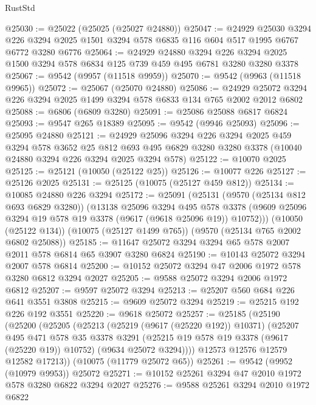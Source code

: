 \begin{lexlean}{RustStd}
\begin{coremodule}
@25030 := @25022 (@25025 (@25027 @24880))
@25047 := @24929
    @25030
    @3294
    @226
    @3294
    @2025
    @1501
    @3294
    @578
    @6835
    @116
    @604
    @517
    @1995
    @6767
    @6772
    @3280
    @6776
@25064 := @24929
    @24880
    @3294
    @226
    @3294
    @2025
    @1500
    @3294
    @578
    @6834
    @125
    @739
    @459
    @495
    @6781
    @3280
    @3280
    @3378
@25067 := @9542 (@9957 (@11518 @9959))
@25070 := @9542 (@9963 (@11518 @9965))
@25072 := @25067 (@25070 @24880)
@25086 := @24929 @25072 @3294 @226 @3294 @2025 @1499 @3294 @578 @6833 @134 @765 @2002 @2012 @6802
@25088 := @6806 (@6809 @3280)
@25091 := @25086 @25088 @6817 @6824
@25093 := @9547 @265 @18389
@25095 := @9542 (@9946 @25093)
@25096 := @25095 @24880
@25121 := @24929
    @25096
    @3294
    @226
    @3294
    @2025
    @459
    @3294
    @578
    @3652
    @25
    @812
    @693
    @495
    @6829
    @3280
    @3280
    @3378
    (@10040 @24880 @3294 @226 @3294 @2025 @3294 @578)
@25122 := @10070 @2025
@25125 := @25121 (@10050 (@25122 @25))
@25126 := @10077 @226
@25127 := @25126 @2025
@25131 := @25125 (@10075 (@25127 @459 @812))
@25134 := @10085 @24880 @226 @3294
@25172 := @25091
    (@25131
      (@9570 (@25134 @812 @693 @6829 @3280))
      (@13138
        @25096
        @3294
        @495
        @578
        @3378
        (@9609 @25096 @3294 @19 @578 @19 @3378 (@9617 (@9618 @25096 @19)) @10752)))
    (@10050 (@25122 @134))
    (@10075 (@25127 @1499 @765))
    (@9570 (@25134 @765 @2002 @6802 @25088))
@25185 := @11647 @25072 @3294 @3294 @65 @578 @2007 @2011 @578 @6814 @65 @3907 @3280 @6824
@25190 := @10143 @25072 @3294 @2007 @578 @6814
@25200 := @10152 @25072 @3294 @47 @2006 @1972 @578 @3280 @6812 @3294 @2027
@25205 := @9588 @25072 @3294 @2006 @1972 @6812
@25207 := @9597 @25072 @3294
@25213 := @25207 @560 @684 @226 @641 @3551 @3808
@25215 := @9609 @25072 @3294
@25219 := @25215 @192 @226 @192 @3551
@25220 := @9618 @25072
@25257 := @25185
    (@25190
      (@25200
        (@25205
          (@25213
            (@25219 (@9617 (@25220 @192)) @10371)
            (@25207
              @495
              @471
              @578
              @35
              @3378
              @3291
              (@25215 @19 @578 @19 @3378 (@9617 (@25220 @19)) @10752)
              (@9634 @25072 @3294))))
        @12573
        @12576
        @12579
        @12582
        @17213))
    (@10075 (@11779 @25072 @65))
@25261 := @9542 (@9952 (@10979 @9953)) @25072
@25271 := @10152 @25261 @3294 @47 @2010 @1972 @578 @3280 @6822 @3294 @2027
@25276 := @9588 @25261 @3294 @2010 @1972 @6822

\end{coremodule}
\end{lexlean}
